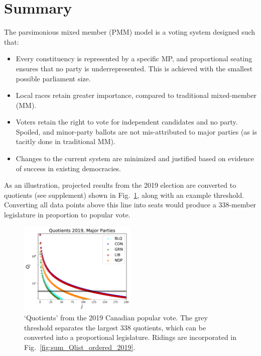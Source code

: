 \section*{Summary}
\renewcommand{\thefigure}{S-\arabic{figure}}

The parsimonious mixed member (PMM) model is a voting system designed such that:

\begin{itemize}
\item Every constituency is represented by a specific MP, and proportional seating ensures that no party is underrepresented. This is achieved with the smallest possible parliament size.
\item Local races retain greater importance, compared to traditional mixed-member (MM).
\item Voters retain the right to vote for independent candidates and no party. Spoiled, and minor-party ballots are not mis-attributed to major parties (as is tacitly done in traditional MM).
\item Changes to the current system are minimized and justified based on evidence of success in existing democracies.
\end{itemize}

As an illustration, projected results from the 2019 election are converted to quotients (see supplement) shown in Fig.~\ref{fig:sum_Qlist_byparty_2019}, along with an example threshold. Converting all data points above this line into seats would produce a 338-member legislature in proportion to popular vote.
\begin{figure}[h!]
  \includegraphics[width=0.50\textwidth,clip]{PR_calcs/data/raw_2019/PMM_out/PMM_Qlist_byparty.pdf}
  \caption{`Quotients' from the 2019 Canadian popular vote. The grey threshold separates the largest 338 quotients, which can be converted into a proportional legislature. Ridings are incorporated in Fig.~\ref{fig:sum_Qlist_ordered_2019}. }
\label{fig:sum_Qlist_byparty_2019}
\end{figure}


